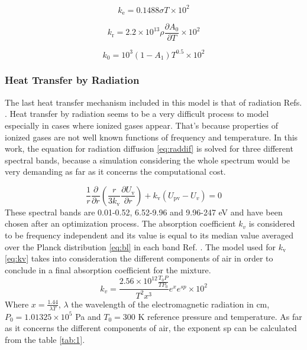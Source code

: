 \documentclass{warpdoc}
\begin{document}
\begin{equation}
     k_\text{e}=0.1488\sigma T\times10^2\label{eq:ke}
\end{equation}

\begin{equation}
    k_\text{r}=2.2\times10^{13}\rho\frac{{\partial}A_0}{\partial T}\times10^2\label{eq:kr}
\end{equation}

\begin{equation}
    k_0=10^3(1-A_1)T^{0.5}\times10^2\label{eq:k0}
\end{equation}
\subsubsection{Heat Transfer by Radiation}
The last heat transfer mechanism included in this model is that of radiation Refs. \cite{shneider,paxton}. Heat transfer by radiation seems to be a very difficult process to model especially in cases where ionized gases appear. That's because properties of ionized gases are not well known functions of frequency and temperature. In this work, the equation for radiation diffusion \eqref{eq:raddif} is solved for three different spectral bands, because a simulation considering the whole spectrum would be very demanding as far as it concerns the computational cost.

\begin{equation}
    \frac{1}{r}\frac{\partial}{\partial r}\left(\frac{r}{3k_\text{v}}\frac{{\partial}U_\text{v}}{\partial r}\right)+k_\text{v}(U_\text{pv}-U_v)=0
    \label{eq:raddif}
\end{equation}
These spectral bands are 0.01-0.52, 6.52-9.96 and 9.96-247 eV and have been chosen after an optimization process. The absorption coefficient $k_v$ is considered to be frequency independent and its value is equal to its median value averaged over the Planck distribution \eqref{eq:bl}
in each band Ref. \cite{avilova,elashevich}. The model used for $k_\text{v}$ \cite{book:zeldovich} \eqref{eq:kv} takes into consideration the different components of air in order to conclude in a final absorption coefficient for the mixture.
\begin{equation}
k_v=\frac{2.56\times10^{12}\frac{T_0P}{TP_0}}{T^2x^3}e^xe^{sp}\times10^2
\label{eq:kv}
\end{equation}
Where $x=\frac{1.44}{\lambda T}$, $\lambda$ the wavelength of the electromagnetic radiation in cm, $P_0=1.01325\times10^5$ Pa and $T_0=300$ K reference pressure and temperature. As far as it concerns the different components of air, the exponent sp can be calculated from the table \ref{tab:1}.
\end{document}
